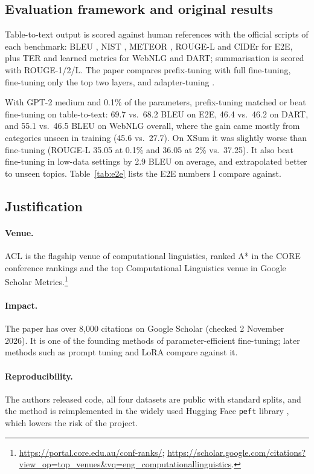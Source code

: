 \documentclass[11pt]{article}
\begin{document}
\subsection{Evaluation framework and original results}
Table-to-text output is scored against human references with the official scripts of each benchmark: BLEU \citep{papineni-etal-2002-bleu}, NIST \citep{doddington-2002-nist}, METEOR \citep{banerjee-lavie-2005-meteor}, ROUGE-L \citep{lin-2004-rouge} and CIDEr \citep{vedantam-etal-2015-cider} for E2E, plus TER and learned metrics for WebNLG and DART; summarisation is scored with ROUGE-1/2/L. The paper compares prefix-tuning with full fine-tuning, fine-tuning only the top two layers, and adapter-tuning \citep{houlsby-etal-2019-adapters}.

With GPT-2 medium and 0.1\% of the parameters, prefix-tuning matched or beat fine-tuning on table-to-text: 69.7 vs.\ 68.2 BLEU on E2E, 46.4 vs.\ 46.2 on DART, and 55.1 vs.\ 46.5 BLEU on WebNLG overall, where the gain came mostly from categories unseen in training (45.6 vs.\ 27.7). On XSum it was slightly worse than fine-tuning (ROUGE-L 35.05 at 0.1\% and 36.05 at 2\% vs.\ 37.25). It also beat fine-tuning in low-data settings by 2.9 BLEU on average, and extrapolated better to unseen topics. Table~\ref{tab:e2e} lists the E2E numbers I compare against.

\subsection{Justification}
\paragraph{Venue.} ACL is the flagship venue of computational linguistics, ranked A* in the CORE conference rankings and the top Computational Linguistics venue in Google Scholar Metrics.\footnote{\url{https://portal.core.edu.au/conf-ranks/}; \url{https://scholar.google.com/citations?view_op=top_venues&vq=eng_computationallinguistics}.}
\paragraph{Impact.} The paper has over 8,000 citations on Google Scholar (checked 2 November 2026). It is one of the founding methods of parameter-efficient fine-tuning; later methods such as prompt tuning \citep{lester-etal-2021-power} and LoRA \citep{hu-etal-2022-lora} compare against it.
\paragraph{Reproducibility.} The authors released code, all four datasets are public with standard splits, and the method is reimplemented in the widely used Hugging Face \texttt{peft} library \citep{mangrulkar-etal-2022-peft}, which lowers the risk of the project.
\end{document}
